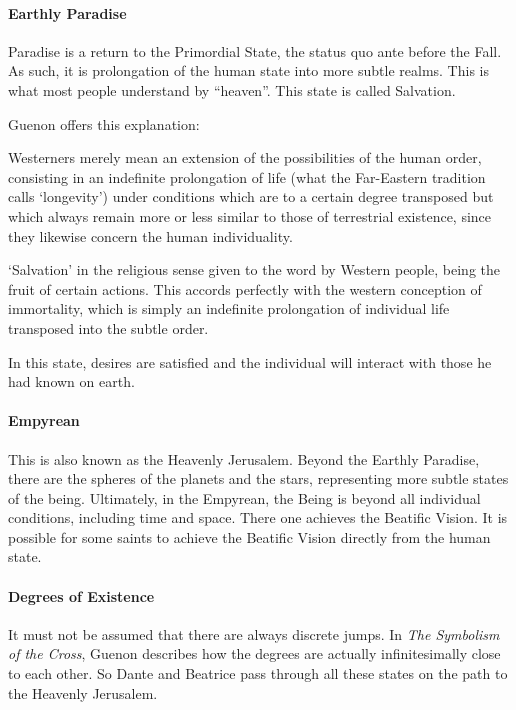 \paragraph{Earthly Paradise}


Paradise is a return to the Primordial State, the status quo ante before the Fall. As such, it is prolongation of the human state into more subtle realms. This is what most people understand by ``heaven''. This state is called Salvation.

Guenon offers this explanation:

\begin{quotationx}
Westerners merely mean an extension of the possibilities of the human order, consisting in an indefinite prolongation of life (what the Far-Eastern tradition calls `longevity') under conditions which are to a certain degree transposed but which always remain more or less similar to those of terrestrial existence, since they likewise concern the human individuality.

`Salvation' in the religious sense given to the word by Western people, being the fruit of certain actions. This accords perfectly with the western conception of immortality, which is simply an indefinite prolongation of individual life transposed into the subtle order.
\end{quotationx}


In this state, desires are satisfied and the individual will interact with those he had known on earth.

\paragraph{Empyrean}


This is also known as the Heavenly Jerusalem. Beyond the Earthly Paradise, there are the spheres of the planets and the stars, representing more subtle states of the being. Ultimately, in the Empyrean, the Being is beyond all individual conditions, including time and space. There one achieves the Beatific Vision. It is possible for some saints to achieve the Beatific Vision directly from the human state.

\paragraph{Degrees of Existence}


It must not be assumed that there are always discrete jumps. In \emph{The Symbolism of the Cross}, Guenon describes how the degrees are actually infinitesimally close to each other. So Dante and Beatrice pass through all these states on the path to the Heavenly Jerusalem.


